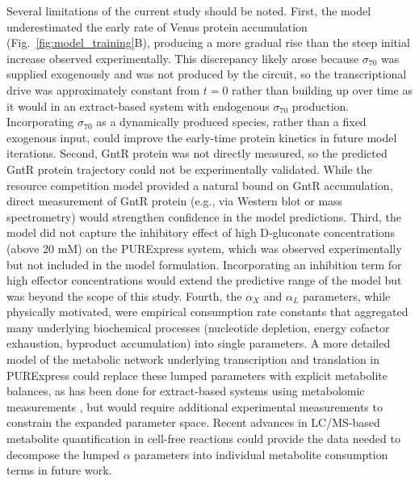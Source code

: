\documentclass[12pt]{article}
\begin{document}
Several limitations of the current study should be noted. First, the model underestimated the early rate of Venus protein accumulation (Fig.~\ref{fig:model_training}B), producing a more gradual rise than the steep initial increase observed experimentally. This discrepancy likely arose because $\sigma_{70}$ was supplied exogenously and was not produced by the circuit, so the transcriptional drive was approximately constant from $t = 0$ rather than building up over time as it would in an extract-based system with endogenous $\sigma_{70}$ production. Incorporating $\sigma_{70}$ as a dynamically produced species, rather than a fixed exogenous input, could improve the early-time protein kinetics in future model iterations. Second, GntR protein was not directly measured, so the predicted GntR protein trajectory could not be experimentally validated. While the resource competition model provided a natural bound on GntR accumulation, direct measurement of GntR protein (e.g., via Western blot or mass spectrometry) would strengthen confidence in the model predictions. Third, the model did not capture the inhibitory effect of high D-gluconate concentrations (above 20 mM) on the PURExpress system, which was observed experimentally but not included in the model formulation. Incorporating an inhibition term for high effector concentrations would extend the predictive range of the model but was beyond the scope of this study. Fourth, the $\alpha_X$ and $\alpha_L$ parameters, while physically motivated, were empirical consumption rate constants that aggregated many underlying biochemical processes (nucleotide depletion, energy cofactor exhaustion, byproduct accumulation) into single parameters. A more detailed model of the metabolic network underlying transcription and translation in PURExpress could replace these lumped parameters with explicit metabolite balances, as has been done for extract-based systems using metabolomic measurements \cite{Vilkhovoy:2019aa,Horvath2020}, but would require additional experimental measurements to constrain the expanded parameter space. Recent advances in LC/MS-based metabolite quantification in cell-free reactions \cite{Vilkhovoy:2019aa} could provide the data needed to decompose the lumped $\alpha$ parameters into individual metabolite consumption terms in future work.
\end{document}
